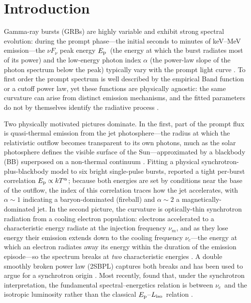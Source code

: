 \documentclass[twocolumn]{aastex631}
\newcommand{\nuc}{\ensuremath{\nu_c}}
\newcommand{\num}{\ensuremath{\nu_m}}
\newcommand{\Ep}{\ensuremath{E_{\rm p}}}
\newcommand{\kT}{\ensuremath{kT}}
\newcommand{\Liso}{\ensuremath{L_{\rm iso}}}
\begin{document}
\section{Introduction} \label{sec:intro}
Gamma-ray bursts (GRBs) are highly variable and exhibit strong spectral
evolution: during the prompt phase---the initial seconds to minutes of
keV--MeV emission---the $\nu F_\nu$ peak energy \Ep\ (the energy at which the
burst radiates most of its power) and the low-energy photon index $\alpha$
(the power-law slope of the photon spectrum below the peak) typically vary
with the prompt light curve \citep[e.g.,][]{Norris1996,Kaneko2006,Lu2012,Yu2016}.
To first order the prompt spectrum is well described by the empirical Band
function \citep{Band1993} or a cutoff power law, yet these functions are
physically agnostic: the same curvature can arise from distinct emission
mechanisms, and the fitted parameters do not by themselves identify the
radiative process \citep[e.g.,][]{KumarZhang2015}.

Two physically motivated pictures dominate. In the first, part of the prompt
flux is quasi-thermal emission from the jet photosphere---the radius at which
the relativistic outflow becomes transparent to its own photons, much as the
solar photosphere defines the visible surface of the Sun---approximated by a
blackbody (BB) superposed on a non-thermal continuum
\citep[e.g.,][]{MeszarosRees2000,Ryde2004,Peer2007,Guiriec2010,Guiriec2011}.
Fitting a physical synchrotron-plus-blackbody model to six bright single-pulse
bursts, \citet{Burgess2014a} reported a tight per-burst correlation
$\Ep\propto\kT^{\alpha}$; because both energies are set by conditions near the
base of the outflow, the index of this correlation traces how the jet
accelerates, with $\alpha\!\sim\!1$ indicating a baryon-dominated (fireball)
and $\alpha\!\sim\!2$ a magnetically-dominated jet. In the second picture, the
curvature is optically-thin synchrotron radiation from a cooling electron
population: electrons accelerated to a characteristic energy radiate at the
injection frequency \num, and as they lose energy their emission extends down
to the cooling frequency \nuc---the energy at which an electron radiates away
its energy within the duration of the emission episode---so the spectrum
breaks at \emph{two} characteristic energies \citep{Sari1998}. A double
smoothly broken power law (2SBPL) captures both breaks and has been used to
argue for a synchrotron origin
\citep[e.g.,][]{Oganesyan2017,Oganesyan2018,Ravasio2018,Ravasio2019}. Most
recently, \citet{Mei2025} found that, under the synchrotron interpretation, the
fundamental spectral--energetics relation is between \nuc\ and the isotropic
luminosity rather than the classical $\Ep$--\Liso\ relation
\citep[the Yonetoku relation;][]{Yonetoku2004}.
\end{document}
